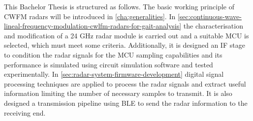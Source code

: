 	This Bachelor Thesis is structured as follows. The basic working principle of CWFM radars will be introduced in \cref{cha:generalities}. In \cref{sec:continuous-wave-lineal-frequency-modulation-cwlfm-radars-for-gait-analysis} the characterisation and modification of a 24 GHz radar module is carried out and a suitable MCU is selected, which must meet some criteria. Additionally, it is designed an IF stage to condition the radar signals for the MCU sampling capabilities and its performance is simulated using circuit simulation software and tested experimentally. In \cref{sec:radar-system-firmware-development} digital signal processing techniques are applied to process the radar signals and extract useful information limiting the number of necessary samples to transmit. It is also designed a transmission pipeline using BLE to send the radar information to the receiving end. %